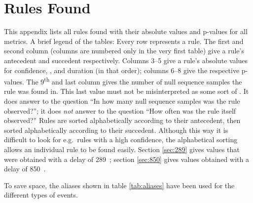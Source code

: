 
\newcommand{\tf}{\addfontfeatures{Numbers={Monospaced,Lining}}}	%
\newcommand{\ts}{~~}											%
\newcommand{\tu}[1]{\multicolumn{1}{c}{\textit{#1}}}		%

\newcommand{\mosp}{\mbox{mo\_speech}}
\newcommand{\mogain}{\mbox{mo\_gaze\_in}}
\newcommand{\mogaob}{\mbox{mo\_gaze\_obj}}
\newcommand{\mogaaw}{\mbox{mo\_gaze\_away}}
\newcommand{\mosm}{\mbox{mo\_smile}}
\newcommand{\invo}{\mbox{in\_voc}}
\newcommand{\ingamo}{\mbox{in\_gaze\_mo}}
\newcommand{\ingaob}{\mbox{in\_gaze\_obj}}
\newcommand{\ingaaw}{\mbox{in\_gaze\_away}}
\newcommand{\insm}{\mbox{in\_sm}}


\chapter{Rules Found}
\label{ch:app_rules}
This appendix lists all rules found with their absolute values and p-values for all metrics.
A brief legend of the tables: Every row represents a rule.
The first and second column (columns are numbered only in the very first table) give a rule's antecedent and succedent respectively.
Columns 3--5 give a rule's absolute values for confidence, \noc, and duration (in that order); columns 6--8 give the respective p-values.
The 9\textsuperscript{th} and last column gives the number of null sequence samples the rule was found in.
This last value must not be misinterpreted as some sort of \noc.
It does answer to the question ``In how many null sequence samples was the rule observed?''; it does \emph{not} answer to the question ``How often was the rule itself observed?''
Rules are sorted alphabetically according to their antecedent, then sorted alphabetically according to their succedent.
Although this way it is difficult to look for e.g.~rules with a high confidence, the alphabetical sorting allows an individual rule to be found easily.
Section \ref{sec:289} gives values that were obtained with a delay of 289~\ms; section \ref{sec:850} gives values obtained with a delay of 850~\ms.

To save space, the aliases shown in table \ref{tab:aliases} have been used for the different types of events.


